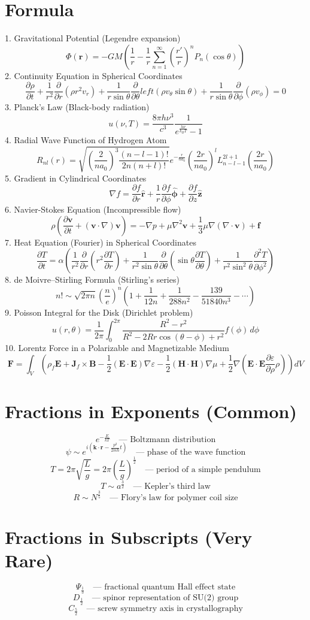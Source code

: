 \documentclass[a4paper,12pt]{article}
\begin{document}
\section{Formula}

1. Gravitational Potential (Legendre expansion)
\[
\Phi(\mathbf{r}) = -GM(\frac{1}{r} - \frac{1}{r} \sum_{n=1}^{\infty}(\frac{r'}{r})^n P_n(\cos \theta))
\]
2. Continuity Equation in Spherical Coordinates
\[
\frac{\partial \rho}{\partial t} + \frac{1}{r^2} \frac{\partial}{\partial r}(\rho r^2 v_r) + \frac{1}{r \sin \theta} \frac{\partial}{\partial \theta}left(\rho v_{\theta} \sin \theta) + \frac{1}{r \sin \theta} \frac{\partial}{\partial \phi}(\rho v_{\phi}) = 0
\]
3. Planck's Law (Black-body radiation)
\[
u(\nu, T) = \frac{8\pi h \nu^3}{c^3} \frac{1}{e^{\frac{h\nu}{k_B T}} - 1}
\]
4. Radial Wave Function of Hydrogen Atom
\[
R_{nl}(r) = \sqrt{(\frac{2}{n a_0})^3 \frac{(n-l-1)!}{2n (n+l)!}} e^{-\frac{r}{n a_0}}(\frac{2r}{n a_0})^l L_{n-l-1}^{2l+1}(\frac{2r}{n a_0})
\]
5. Gradient in Cylindrical Coordinates
\[
\nabla f = \frac{\partial f}{\partial r} \hat{\mathbf{r}} + \frac{1}{r} \frac{\partial f}{\partial \phi} \hat{\bm{\phi}} + \frac{\partial f}{\partial z} \hat{\mathbf{z}}
\]
6. Navier-Stokes Equation (Incompressible flow)
\[
\rho(\frac{\partial \mathbf{v}}{\partial t} + (\mathbf{v} \cdot \nabla) \mathbf{v}) = -\nabla p + \mu \nabla^2 \mathbf{v} + \frac{1}{3} \mu \nabla (\nabla \cdot \mathbf{v}) + \mathbf{f}
\]
7. Heat Equation (Fourier) in Spherical Coordinates
\[
\frac{\partial T}{\partial t} = \alpha(\frac{1}{r^2} \frac{\partial}{\partial r}(r^2 \frac{\partial T}{\partial r}) + \frac{1}{r^2 \sin \theta} \frac{\partial}{\partial \theta}(\sin \theta \frac{\partial T}{\partial \theta}) + \frac{1}{r^2 \sin^2 \theta} \frac{\partial^2 T}{\partial \phi^2})
\]
8. de Moivre–Stirling Formula (Stirling's series)
\[
n! \sim \sqrt{2\pi n}(\frac{n}{e})^n(1 + \frac{1}{12n} + \frac{1}{288n^2} - \frac{139}{51840n^3} - \cdots)
\]
9. Poisson Integral for the Disk (Dirichlet problem)
\[
u(r, \theta) = \frac{1}{2\pi} \int_0^{2\pi} \frac{R^2 - r^2}{R^2 - 2Rr\cos(\theta - \phi) + r^2} f(\phi) \, d\phi
\]
10. Lorentz Force in a Polarizable and Magnetizable Medium
\[
\mathbf{F} = \int_V(\rho_f \mathbf{E} + \mathbf{J}_f \times \mathbf{B} - \frac{1}{2} (\mathbf{E} \cdot \mathbf{E}) \nabla \varepsilon - \frac{1}{2} (\mathbf{H} \cdot \mathbf{H}) \nabla \mu + \frac{1}{2} \nabla(\mathbf{E} \cdot \mathbf{E} \frac{\partial \varepsilon}{\partial \rho} \rho)) dV
\]
\section{Fractions in Exponents (Common)}
\[
e^{-\frac{E}{kT}} \quad \text{— Boltzmann distribution}
\]
\[
\psi \sim e^{i(\mathbf{k}\cdot\mathbf{r} - \frac{p^2}{2m\hbar}t)} \quad \text{— phase of the wave function}
\]
\[
T = 2\pi \sqrt{\frac{L}{g}} = 2\pi(\frac{L}{g})^{\frac{1}{2}} \quad \text{— period of a simple pendulum}
\]
\[
T \sim a^{\frac{3}{2}} \quad \text{— Kepler's third law}
\]
\[
R \sim N^{\frac{3}{5}} \quad \text{— Flory's law for polymer coil size}
\]
\section{Fractions in Subscripts (Very Rare)}
\[
\Psi_{\frac{1}{3}} \quad \text{— fractional quantum Hall effect state}
\]
\[
D_{\frac{1}{2}} \quad \text{— spinor representation of SU(2) group}
\]
\[
C_{\frac{5}{2}} \quad \text{— screw symmetry axis in crystallography}
\]
\end{document}
